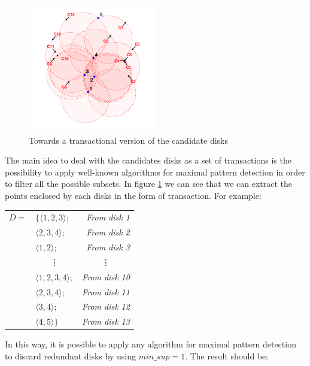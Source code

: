 \documentclass[10pt]{scrartcl}
\begin{document}
\begin{figure}   
  \centering 
  \includegraphics[width=0.5\textwidth]{../Viz/zoom}
  \caption[]{{\small Towards a transactional version of the candidate disks}}    
  \label{fig:candidates}
\end{figure}

The main idea to deal with the candidates disks as a set of transactions is the possibility to apply well-known algorithms for maximal pattern detection in order to filter all the possible subsets.  In figure \ref{fig:candidates} we can see that we can extract the points enclosed by each disks in the form of transaction.  For example:

\vspace{2mm}
\begin{tabular}{r l r}
$D =$ 	& $\{ \langle 1, 2, 3 \rangle; $ 	& {\small \textit{From disk 1}}\\
	& $   \langle 2, 3, 4 \rangle; $ 	& {\small \textit{From disk 2}}\\
	& $   \langle 1, 2 \rangle; $	 	& {\small \textit{From disk 3}}\\
	& \multicolumn{1}{c}{\vdots}		& \multicolumn{1}{c}{\vdots} \\
	& $   \langle 1, 2, 3, 4 \rangle; $ 	& {\small \textit{From disk 10}}\\
	& $   \langle 2, 3, 4 \rangle; $ 	& {\small \textit{From disk 11}}\\
	& $   \langle 3, 4 \rangle; $ 		& {\small \textit{From disk 12}}\\
	& $   \langle 4, 5 \rangle \} $		& {\small \textit{From disk 13}}\\
\end{tabular}
\vspace{2mm}

In this way, it is possible to apply any algorithm for maximal pattern detection to discard redundant disks by using $min\_sup=1$.  The result should be:
\end{document}
